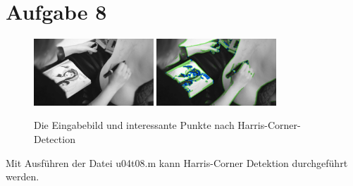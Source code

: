 




\newcommand{\nr}{3}


\section*{Aufgabe 8}

\begin{figure}[htpb]
\begin{center}
{\includegraphics[width=0.4\textwidth]{samples/mrs.easy/101.png}}
{\includegraphics[width=0.4\textwidth]{u04.surf/harris_corner.png}}
\end{center}
\caption{Die Eingabebild und interessante Punkte nach Harris-Corner-Detection}
\label{fig:u04-picture}
\end{figure}

Mit Ausführen der Datei u04t08.m kann Harris-Corner Detektion durchgef\"uhrt werden.

